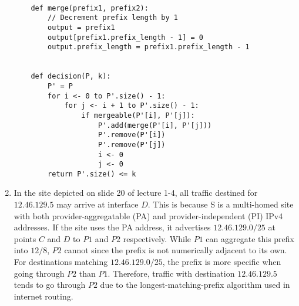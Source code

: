\documentclass[12pt]{article}
\begin{document}
\begin{enumerate}
\begin{verbatim}
    
    def merge(prefix1, prefix2):
        // Decrement prefix length by 1
        output = prefix1
        output[prefix1.prefix_length - 1] = 0
        output.prefix_length = prefix1.prefix_length - 1    
    
    
    def decision(P, k):
        P' = P
        for i <- 0 to P'.size() - 1:
            for j <- i + 1 to P'.size() - 1:
                if mergeable(P'[i], P'[j]):
                    P'.add(merge(P'[i], P'[j]))
                    P'.remove(P'[i])
                    P'.remove(P'[j])
                    i <- 0
                    j <- 0
        return P'.size() <= k    					
    \end{verbatim}
	  
	\item In the site depicted on slide 20 of lecture 1-4, all traffic destined for $12.46.129.5$ may arrive at interface $D$. This is because S is a multi-homed site with both provider-aggregatable (PA) and provider-independent (PI) IPv4 addresses. If the site uses the PA address, it advertises $12.46.129.0/25$ at points $C$ and $D$ to $P1$ and $P2$ respectively. While $P1$ can aggregate this prefix into $12/8$, $P2$ cannot since the prefix is not numerically adjacent to its own. For destinations matching $12.46.129.0/25$, the prefix is more specific when going through $P2$ than $P1$. Therefore, traffic with destination $12.46.129.5$ tends to go through $P2$ due to the longest-matching-prefix algorithm used in internet routing. \\
	

\end{enumerate}
\end{document}
